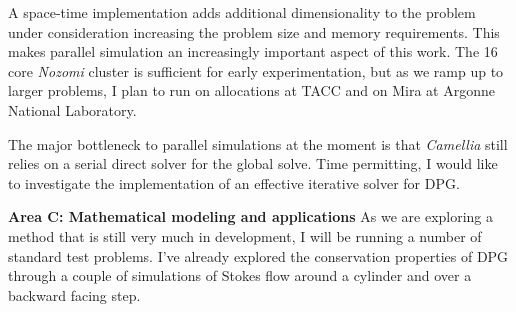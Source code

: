 \documentclass[letterpaper]{article}
\begin{document}
A space-time implementation adds additional dimensionality to the problem under consideration increasing the problem size and memory requirements.
This makes parallel simulation an increasingly important aspect of this work.
The 16 core \emph{Nozomi} cluster is sufficient for early experimentation, but as we ramp up to larger problems, I plan to run on allocations at TACC and on Mira at Argonne National Laboratory.

The major bottleneck to parallel simulations at the moment is that \emph{Camellia} still relies on a serial direct solver for the global solve.
Time permitting, I would like to investigate the implementation of an effective iterative solver for DPG.



\textbf{Area C: Mathematical modeling and applications}
As we are exploring a method that is still very much in development, I will be running a number of standard test problems.
I've already explored the conservation properties of DPG through a couple of simulations of Stokes flow around a cylinder and over
a backward facing step.
\end{document}
